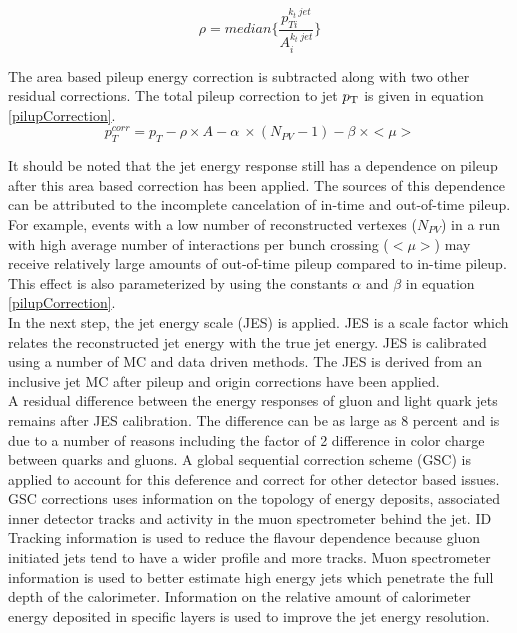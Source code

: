 \begin{equation}
\rho=median\{ \frac{p_{T i}^{k_t~jet}}{A_i^{k_t~jet}} \}
\label{eqn:PileupDensity}
\end{equation}

\indent The area based pileup energy correction is subtracted along with two other residual corrections.  The total pileup correction to jet $p_{\mathrm{T}}$ is given in equation \ref{pilupCorrection}. \\

\begin{equation}
p_T^{corr} = p_T - \rho \times A - \alpha~\times (N_{PV} - 1 ) - \beta~\times <\mu>
\label{eqn:pilupCorrection}
\end{equation}

\indent  It should be noted that the jet energy response still has a dependence on pileup after this area based correction has been applied.  The sources of this dependence can be attributed to the incomplete cancelation of in-time and out-of-time pileup.\cite{JetCalibartion13TeV}  For example, events with a low number of reconstructed vertexes ($N_{PV}$) in a run with high average number of interactions per bunch crossing ($<\mu>$) may receive relatively large amounts of out-of-time pileup compared to in-time pileup.  This effect is also parameterized by using the constants $\alpha$ and $\beta$ in equation \ref{pilupCorrection}. \\  

\indent In the next step, the jet energy scale (JES) is applied.  JES is a scale factor which relates the reconstructed jet energy with the true jet energy.  JES is calibrated using a number of MC and data driven methods.  The JES is derived from an inclusive jet MC after pileup and origin corrections have been applied.  \\

\indent A residual difference between the energy responses of gluon and light quark jets remains after JES calibration.\cite{JetCalibartion13TeV}  The difference can be as large as 8 percent and is due to a number of reasons including the factor of 2 difference in color charge between quarks and gluons.  A global sequential correction scheme (GSC) is applied to account for this deference and correct for other detector based issues.\cite{jet_GSC}  \\

\indent GSC corrections uses information on the topology of energy deposits, associated inner detector tracks and activity in the muon spectrometer behind the jet.  ID Tracking information is used to reduce the flavour dependence because gluon initiated jets tend to have a wider profile and more tracks. Muon spectrometer information is used to better estimate high energy jets which penetrate the full depth of the calorimeter.  Information on the relative amount of calorimeter energy deposited in specific layers is used to improve the jet energy resolution. \\

